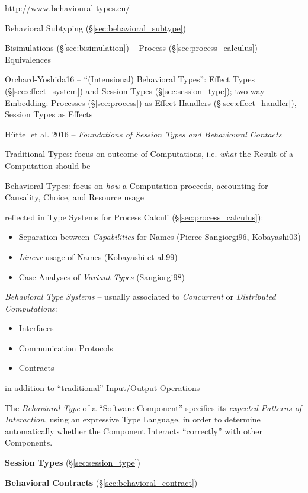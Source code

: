 \url{http://www.behavioural-types.eu/}

\fist Behavioral Subtyping (\S\ref{sec:behavioral_subtype})

\fist Bisimulations (\S\ref{sec:bisimulation}) -- Process
(\S\ref{sec:process_calculus}) Equivalences

Orchard-Yoshida16 \cite{orchard-yoshida16} -- ``(Intensional)
Behavioral Types'': Effect Types (\S\ref{sec:effect_system}) and
Session Types (\S\ref{sec:session_type}); two-way Embedding: Processes
(\S\ref{sec:process}) as Effect Handlers (\S\ref{sec:effect_handler}),
Session Types as Effects


\asterism


H\"uttel et al. 2016 --
\emph{Foundations of Session Types and Behavioural Contacts}

Traditional Types: focus on outcome of Computations, i.e. \emph{what}
the Result of a Computation should be

Behavioral Types: focus on \emph{how} a Computation proceeds,
accounting for Causality, Choice, and Resource usage

reflected in Type Systems for Process Calculi
(\S\ref{sec:process_calculus}):
\begin{itemize}
  \item Separation between \emph{Capabilities} for Names
    (Pierce-Sangiorgi96, Kobayashi03)
  \item \emph{Linear} usage of Names (Kobayashi et al.99)
  \item Case Analyses of \emph{Variant Types} (Sangiorgi98)
\end{itemize}

\emph{Behavioral Type Systems} -- usually associated to
\emph{Concurrent} or \emph{Distributed Computations}:
\begin{itemize}
  \item Interfaces
  \item Communication Protocols
  \item Contracts
\end{itemize}
in addition to ``traditional'' Input/Output Operations

The \emph{Behavioral Type} of a ``Software Component'' specifies its
\emph{expected Patterns of Interaction}, using an expressive Type
Language, in order to determine automatically whether the Component
Interacts ``correctly'' with other Components.

\textbf{Session Types} (\S\ref{sec:session_type})

\textbf{Behavioral Contracts} (\S\ref{sec:behavioral_contract})

